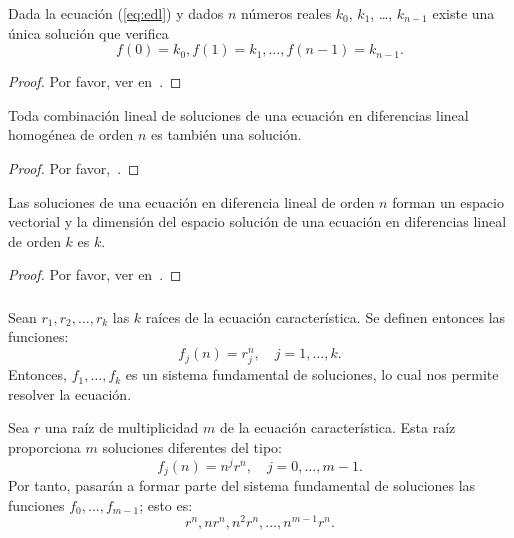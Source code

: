 \begin{frame}

\begin{theorem}
Dada la ecuación (\ref{eq:edl}) y dados $n$ números reales $k_{0}$, $k_{1}$, \ldots, $k_{n-1}$ existe una única solución que verifica \[ f\left(0\right)=k_{0},f\left(1\right)=k_{1},\ldots,f\left(n-1\right)=k_{n-1}. \]
\end{theorem}

\begin{proof}
Por favor, ver en~\citeauthor[el teorema 5.3.1]{nadal2014}.
\end{proof}

\begin{theorem}
Toda combinación lineal de soluciones de una ecuación en diferencias lineal homogénea de orden $n$ es también una solución.
\end{theorem}
\begin{proof}
Por favor,~\citeauthor[ver en][357]{Mariconda2016}.
\end{proof}

\begin{theorem}
Las soluciones de una ecuación en diferencia lineal de orden $n$ forman un espacio vectorial y la dimensión del espacio solución de una ecuación en diferencias lineal de orden $k$ es $k$.
\end{theorem}

\begin{proof}
Por favor, ver en~\citeauthor[el corolario 5.3.1]{nadal2014}.
\end{proof}
\end{frame}

\begin{frame}
\frametitle{\subsubsecname}

\begin{definition}
Sean $r_{1}, r_{2},\ldots, r_{k}$ las $k$ raíces de la ecuación característica. Se definen entonces las funciones: \[ f_{j}(n)=r^{n}_{j},\quad j=1,\ldots,k. \] Entonces, $f_{1},\ldots,f_{k}$ es un sistema fundamental de soluciones, lo cual nos permite resolver la ecuación. %
\end{definition}

\begin{definition}
Sea $r$ una raíz de multiplicidad $m$ de la ecuación característica. Esta raíz proporciona $m$ soluciones diferentes del tipo: \[ f_{j}(n)=n^{j}r^{n},\quad j= 0,\ldots,m-1. \] Por tanto, pasarán a formar parte del sistema fundamental de soluciones las funciones $f_{0},\ldots,f_{m-1}$; esto es: \[ r^{n},nr^{n},n^{2}r^{n},\ldots,n^{m-1}r^{n}. \]
\end{definition}
\end{frame}

